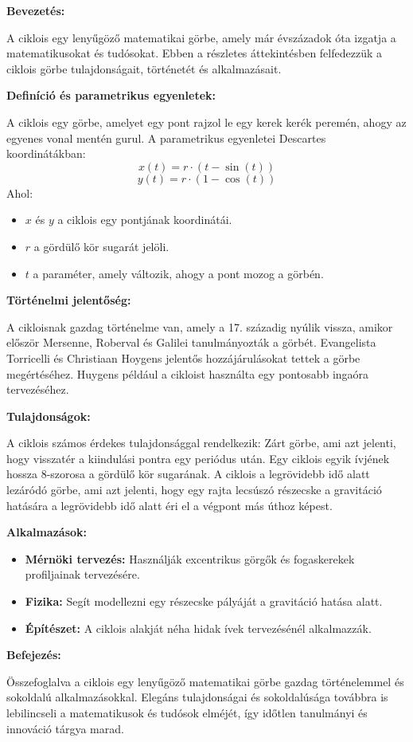 \documentclass[11pt,a4paper]{article}
\begin{document}
{\Large \textbf{Bevezetés:} \par}
A ciklois egy lenyűgöző matematikai görbe, amely már évszázadok óta izgatja a matematikusokat és tudósokat. Ebben a részletes áttekintésben felfedezzük a ciklois görbe tulajdonságait, történetét és alkalmazásait.
\\
{\Large \textbf{Definíció és parametrikus egyenletek:}\par}
A ciklois egy görbe, amelyet egy pont rajzol le egy kerek kerék peremén, ahogy az egyenes vonal mentén gurul. A parametrikus egyenletei Descartes koordinátákban:
$$x(t) = r \cdot (t - \sin(t))$$
$$y(t) = r \cdot (1 - \cos(t))$$
Ahol:
\begin{itemize}
    \setlength\itemsep{3pt}
    \item \(x\) és \(y\) a ciklois egy pontjának koordinátái.
    \item \(r\) a gördülő kör sugarát jelöli.
    \item \(t\) a paraméter, amely változik, ahogy a pont mozog a görbén.
\end{itemize}

{\Large \textbf{Történelmi jelentőség:}\par}

A cikloisnak gazdag történelme van, amely a 17. századig nyúlik vissza, amikor először Mersenne, Roberval és Galilei tanulmányozták a görbét. Evangelista Torricelli és Christiaan Hoygens jelentős hozzájárulásokat tettek a görbe megértéséhez. Huygens például a cikloist használta egy pontosabb ingaóra tervezéséhez.\\

{\Large\textbf{Tulajdonságok:}\par}
A ciklois számos érdekes tulajdonsággal rendelkezik: Zárt görbe, ami azt jelenti, hogy visszatér a kiindulási pontra egy periódus után. Egy ciklois egyik ívjének hossza 8-szorosa a gördülő kör sugarának. A ciklois a legrövidebb idő alatt lezáródó görbe, ami azt jelenti, hogy egy rajta lecsúszó részecske a gravitáció hatására a legrövidebb idő alatt éri el a végpont más úthoz képest.\\

{\Large\textbf{Alkalmazások:}\par}
\begin{itemize}
    \item \textbf{Mérnöki tervezés:} Használják excentrikus görgők és fogaskerekek profiljainak tervezésére.
    \item \textbf{Fizika:} Segít modellezni egy részecske pályáját a gravitáció hatása alatt.
    \item \textbf{Építészet:} A ciklois alakját néha hidak ívek tervezésénél alkalmazzák.
\end{itemize}
\vspace{5pt}
{\Large \textbf{Befejezés:} \par}
Összefoglalva a ciklois egy lenyűgöző matematikai görbe gazdag történelemmel és sokoldalú alkalmazásokkal. Elegáns tulajdonságai és sokoldalúsága továbbra is lebilincseli a matematikusok és tudósok elméjét, így időtlen tanulmányi és innováció tárgya marad.
\end{document}
